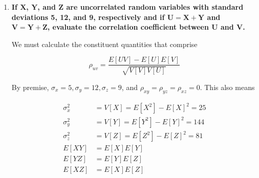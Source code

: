 \documentclass[10pt, oneside]{article}
\begin{document}
\begin{enumerate}[label=7.\arabic*]
  \begin{thm*}
  If $y = ax + b$ is the least-squares approximation to $E[Y | x]$ and if $E[Y | x]$ is in fact a linear function of $x$, that is
  
  \[ E[Y | x] = a'x + b' \]
  
  then $a = a'$ and $b = b'$. An analogous statement holds for the regression of $X$ on $Y$.
  \end{thm*}
  
  By premise, $a,b$ are such that $E[(E[Y | X] - (aX + b))^2] = E[((a'X + b') - (aX + b))^2]$ is minimized. Expanding, the expression, we find
  
  \begin{align*}
  E[((a'X + b') - (aX + b))^2] &= E[((a' - a)X + (b' - b))^2] \\
  &= E[(a'-a)^2 X^2 + 2(a' - a)(b' - b) X = (b' - b)^2] \\
  &= (a' - a)^2 E[X^2] + 2(a' - a) (b' - b) E[X] + (b' - b)^2
  \end{align*}
  
  Observe that $(a' - a)^2 \geq 0$, as does $E[X^2] \geq 0$ (an average of exclusively zero or positive values is necessarily zero or positive) and $(b' - b)^2 \geq 0$. Since we wish to minimize the above expression, it follows that the only way to do so is for $a' - a = b' - b = 0$. Then $E[(E[Y | X] - (aX + b))^2] = 0$, which is indeed the lowest value it can take given that the argument of the expectation is a square term, and $a' = a, b' = b$.

\item  \begin{tcolorbox}[
  colback=Cerulean!5!white,
  colframe=Cerulean!75!black]
  \textbf{If $\bm{X}$, $\bm{Y}$, and $\bm{Z}$ are uncorrelated random variables with standard deviations 5, 12, and 9, respectively and if $\bm{U = X + Y}$ and $\bm{V = Y + Z}$, evaluate the correlation coefficient between $\bm{U}$ and $\bm{V}$.}
  \end{tcolorbox}
  
  We must calculate the constituent quantities that comprise
  
  \[ \rho_{uv} = \frac{E[UV] - E[U] E[V]}{\sqrt{V[V] V[U]}} \]
  
  By premise, $\sigma_x = 5, \sigma_y = 12, \sigma_z = 9$, and $\rho_{xy} = \rho_{yz} = \rho_{xz} = 0$. This also means
  
  \begin{align*}
  \sigma^2_x &= V[X] = E[X^2] - E[X]^2 = 25 \\
  \sigma^2_y &= V[Y] = E[Y^2] - E[Y]^2 = 144 \\
  \sigma^2_z &= V[Z] = E[Z^2] - E[Z]^2 = 81 \\
  E[XY] &= E[X] E[Y] \\
  E[YZ] &= E[Y] E[Z] \\
  E[XZ] &= E[X] E[Z]
  \end{align*}
  

\end{enumerate}
\end{document}
